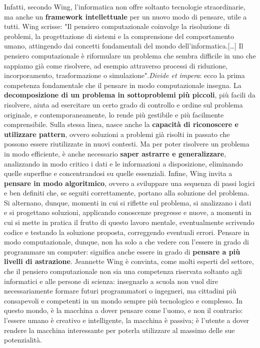 Infatti, secondo Wing, l'informatica non offre soltanto tecnologie straordinarie, ma anche un \textbf{framework intellettuale} per un nuovo modo di pensare, utile a tutti. 
Wing scrisse: "Il pensiero computazionale coinvolge la risoluzione di problemi, la progettazione di sistemi e la comprensione del comportamento umano, attingendo dai concetti
fondamentali del mondo dell'informatica.[\ldots] Il pensiero computazionale è riformulare un problema che sembra difficile in uno che sappiamo già come risolvere, ad esempio
attraverso processi di riduzione, incorporamento, trasformazione o simulazione".\space\textit{Divide et impera}: ecco la prima competenza fondamentale che il pensare in modo computazionale insegna. La 
\textbf{decomposizione di un problema in sottoproblemi più piccoli}, più facili da risolvere, aiuta ad esercitare un certo grado di controllo e ordine sul problema originale, e contemporaneamente, lo rende più 
gestibile e più facilmente comprensibile. Sulla stessa linea, nasce anche la \textbf{capacità di riconoscere e utilizzare pattern}, ovvero
soluzioni a problemi già risolti in passato che possono essere riutilizzate in nuovi contesti. Ma per poter risolvere un problema in modo efficiente, è anche necessario 
\textbf{saper astrarre e generalizzare}, analizzando in modo critico i dati e le informazioni a disposizione, eliminando quelle superflue e concentrandosi su quelle essenziali.
Infine, Wing invita a \textbf{pensare in modo algoritmico}, ovvero a sviluppare una sequenza di passi logici e ben definiti che, se seguiti correttamente, portano alla soluzione del problema.
Si alternano, dunque, momenti in cui si riflette sul problema, si analizzano i dati e si progettano soluzioni, applicando conoscenze pregresse e nuove, a momenti in cui 
si mette in pratica il frutto di questo lavoro mentale, eventualmente scrivendo codice e testando la soluzione proposta, correggendo eventuali errori.
Pensare in modo computazionale, dunque, non ha solo a che vedere con l'essere in grado di 
programmare un computer: significa anche essere in grado di \textbf{pensare a più livelli di astrazione}. Jeannette Wing è convinta, come molti esperti del settore, che il pensiero computazionale 
non sia una competenza riservata soltanto agli informatici e alle persone di scienza: insegnarlo a scuola non vuol dire necessariamente formare futuri programmatori o ingegneri, ma cittadini più
consapevoli e competenti in un mondo sempre più tecnologico e complesso. In questo mondo, è la macchina a dover pensare come l'uomo,
e non il contrario: l'essere umano è creativo e intelligente, la macchina è passiva; è l'utente a dover rendere la macchina interessante per poterla utilizzare al massimo delle sue potenzialità.

